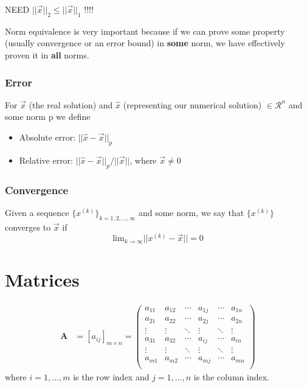 \documentclass[12pt]{article}
\newcommand{\ve}[1]{\ensuremath{\mathbf{#1}}}
\begin{document}
NEED $||\vec{x}||_2 \leq ||\vec{x}||_1$ !!!!

Norm equivalence is very important because if we can prove some property (usually convergence or an error bound) in \textbf{some} norm, we have effectively proven it in \textbf{all} norms. 

\subsubsection{Error}
For $\vec{x}$ (the real solution) and $\hat{x}$ (representing our numerical solution) $\in \mathcal{R}^n$ and some norm p we define
%
\begin{itemize}
\item Absolute error: $||\hat{x} - \vec{x}||_p$
\item Relative error: $||\hat{x} - \vec{x}||_p / ||\vec{x}||$, where $\vec{x} \neq 0$
\end{itemize}

\subsubsection{Convergence}
Given a sequence $\lbrace x^{(k)} \rbrace_{k=1,2,\dots,\infty}$ and some norm, we say that $\lbrace x^{(k)} \rbrace$ converges to $\vec{x}$ if
%
\begin{equation}
\displaystyle\text{lim}_{k \rightarrow \infty} ||x^{(k)} - \vec{x}|| = 0 \nonumber
\end{equation}

\section{Matrices}

\begin{align}
    \ve{A} &= [a_{ij}]_{m\times n}   =    \begin{pmatrix}
      a_{11} & a_{12} & \cdots & a_{1j} & \cdots & a_{1n} \\
      a_{21} & a_{22} & \cdots & a_{2j} & \cdots & a_{2n} \\
       \vdots & \vdots & \ddots & \vdots & \ddots   & \vdots \\     
      a_{31} & a_{32} & \cdots & a_{ij} & \cdots & a_{in} \\
      \vdots & \vdots & \ddots & \vdots & \ddots   & \vdots \\
      a_{m1} & a_{m2} & \cdots & a_{mj} & \cdots & a_{mn} \\
    \end{pmatrix} \nonumber   
\end{align} 
%
where $i = 1, \dots, m$ is the row index and $j = 1, \dots, n$ is the column index.
\end{document}
